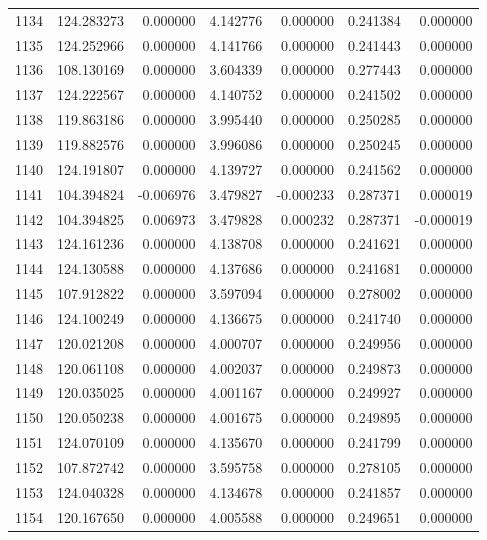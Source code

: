 \begin{tabular}{rrrrrrr}
1134 & 124.283273 &    0.000000 &  4.142776 &   0.000000 &   0.241384 &  0.000000 \\
1135 & 124.252966 &    0.000000 &  4.141766 &   0.000000 &   0.241443 &  0.000000 \\
1136 & 108.130169 &    0.000000 &  3.604339 &   0.000000 &   0.277443 &  0.000000 \\
1137 & 124.222567 &    0.000000 &  4.140752 &   0.000000 &   0.241502 &  0.000000 \\
1138 & 119.863186 &    0.000000 &  3.995440 &   0.000000 &   0.250285 &  0.000000 \\
1139 & 119.882576 &    0.000000 &  3.996086 &   0.000000 &   0.250245 &  0.000000 \\
1140 & 124.191807 &    0.000000 &  4.139727 &   0.000000 &   0.241562 &  0.000000 \\
1141 & 104.394824 &   -0.006976 &  3.479827 &  -0.000233 &   0.287371 &  0.000019 \\
1142 & 104.394825 &    0.006973 &  3.479828 &   0.000232 &   0.287371 & -0.000019 \\
1143 & 124.161236 &    0.000000 &  4.138708 &   0.000000 &   0.241621 &  0.000000 \\
1144 & 124.130588 &    0.000000 &  4.137686 &   0.000000 &   0.241681 &  0.000000 \\
1145 & 107.912822 &    0.000000 &  3.597094 &   0.000000 &   0.278002 &  0.000000 \\
1146 & 124.100249 &    0.000000 &  4.136675 &   0.000000 &   0.241740 &  0.000000 \\
1147 & 120.021208 &    0.000000 &  4.000707 &   0.000000 &   0.249956 &  0.000000 \\
1148 & 120.061108 &    0.000000 &  4.002037 &   0.000000 &   0.249873 &  0.000000 \\
1149 & 120.035025 &    0.000000 &  4.001167 &   0.000000 &   0.249927 &  0.000000 \\
1150 & 120.050238 &    0.000000 &  4.001675 &   0.000000 &   0.249895 &  0.000000 \\
1151 & 124.070109 &    0.000000 &  4.135670 &   0.000000 &   0.241799 &  0.000000 \\
1152 & 107.872742 &    0.000000 &  3.595758 &   0.000000 &   0.278105 &  0.000000 \\
1153 & 124.040328 &    0.000000 &  4.134678 &   0.000000 &   0.241857 &  0.000000 \\
1154 & 120.167650 &    0.000000 &  4.005588 &   0.000000 &   0.249651 &  0.000000 \\

\end{tabular}
